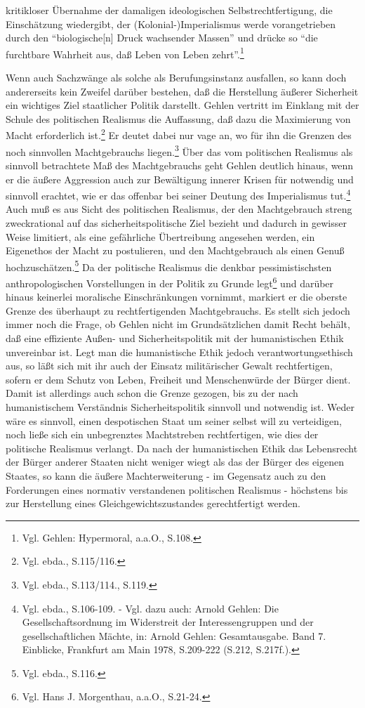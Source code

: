 \documentclass[12pt,a4paper]{article}
\begin{document}
kritikloser Übernahme der damaligen ideologischen
Selbstrechtfertigung, die Einschätzung wiedergibt, der
(Kolonial-)Imperialismus werde vorangetrieben durch den
"`biologische[n] Druck wachsender Massen"' und drücke so "`die
furchtbare Wahrheit aus, daß Leben von Leben zehrt"'.\footnote{Vgl.
  Gehlen: Hypermoral, a.a.O., S.108.}

Wenn auch Sachzwänge als solche als Berufungsinstanz ausfallen, so kann doch
andererseits kein Zweifel darüber bestehen, daß die Herstellung äußerer
Sicherheit ein wichtiges Ziel staatlicher Politik darstellt. Gehlen vertritt
im Einklang mit der Schule des politischen Realismus die Auffassung, daß dazu
die Maximierung von Macht erforderlich ist.\footnote{Vgl. ebda., S.115/116.}
Er deutet dabei nur vage an, wo für ihn die Grenzen des noch sinnvollen
Machtgebrauchs liegen.\footnote{Vgl. ebda., S.113/114., S.119.} Über das vom
politischen Realismus als sinnvoll betrachtete Maß des Machtgebrauchs geht
Gehlen deutlich hinaus, wenn er die äußere Aggression auch zur Bewältigung
innerer Krisen für notwendig und sinnvoll erachtet, wie er das offenbar bei
seiner Deutung des Imperialismus tut.\footnote{Vgl. ebda., S.106-109. -
Vgl. dazu auch: Arnold Gehlen: Die Gesellschaftsordnung im Widerstreit der
Interessengruppen und der gesellschaftlichen Mächte, in: Arnold Gehlen:
Gesamtausgabe. Band 7.  Einblicke, Frankfurt am Main 1978, S.209-222 (S.212,
S.217f.).} Auch muß es aus Sicht des politischen Realismus, der den
Machtgebrauch streng zweckrational auf das sicherheitspolitische Ziel bezieht
und dadurch in gewisser Weise limitiert, als eine gefährliche Übertreibung
angesehen werden, ein Eigenethos der Macht zu postulieren, und den
Machtgebrauch als einen Genuß hochzuschätzen.\footnote{Vgl. ebda., S.116.} Da
der politische Realismus die denkbar pessimistischsten anthropologischen
Vorstellungen in der Politik zu Grunde legt\footnote{Vgl. Hans J. Morgenthau,
a.a.O., S.21-24.} und darüber hinaus keinerlei moralische Einschränkungen
vornimmt, markiert er die oberste Grenze des überhaupt zu rechtfertigenden
Machtgebrauchs. Es stellt sich jedoch immer noch die Frage, ob Gehlen nicht
im Grundsätzlichen damit Recht behält, daß eine effiziente Außen- und
Sicherheitspolitik mit der humanistischen Ethik unvereinbar ist. Legt man die
humanistische Ethik jedoch verantwortungsethisch aus, so läßt sich mit ihr
auch der Einsatz militärischer Gewalt rechtfertigen, sofern er dem Schutz von
Leben, Freiheit und Menschenwürde der Bürger dient. Damit ist allerdings auch
schon die Grenze gezogen, bis zu der nach humanistischem Verständnis
Sicherheitspolitik sinnvoll und notwendig ist. Weder wäre es sinnvoll, einen
despotischen Staat um seiner selbst will zu verteidigen, noch ließe sich ein
unbegrenztes Machtstreben rechtfertigen, wie dies der politische Realismus
verlangt. Da nach der humanistischen Ethik das Lebensrecht der Bürger anderer
Staaten nicht weniger wiegt als das der Bürger des eigenen Staates, so kann
die äußere Machterweiterung - im Gegensatz auch zu den Forderungen eines
normativ verstandenen politischen Realismus - höchstens bis zur Herstellung
eines Gleichgewichtszustandes gerechtfertigt werden.
\end{document}
